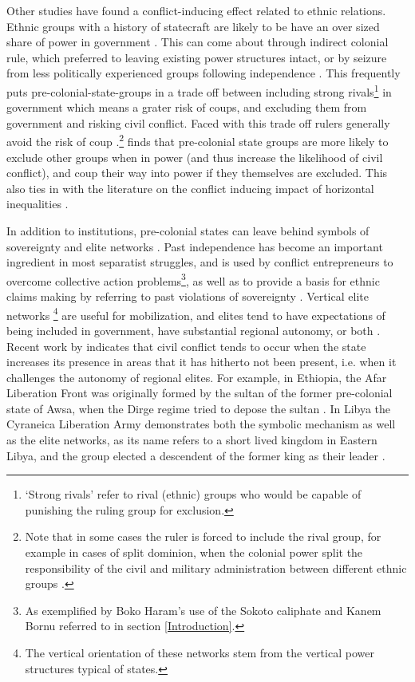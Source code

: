 \documentclass[12pt]{article}
\begin{document}
Other studies have found a conflict-inducing effect related to ethnic relations.
Ethnic groups with a history of statecraft are likely to be have an over sized
share of power in government \citep{Wucherpfennig2016}. This can come about
through indirect colonial rule, which preferred to leaving existing power
structures intact, or by seizure from less politically experienced groups
following independence \citep{Paine2019}. This frequently puts
pre-colonial-state-groups in a trade off between including strong
rivals\footnote{`Strong rivals' refer to rival (ethnic) groups who would be
capable of punishing the ruling group for exclusion.} in government which means
a grater risk of coups, and excluding them from government and risking civil
conflict. Faced with this trade off rulers generally avoid the risk of coup
\citep{Paine2019, Powell_2014, Roessler_2011}.\footnote{Note that in some cases
	the ruler is forced to include the rival group, for example in cases of
split dominion, when the colonial power split the responsibility of the civil
and military administration between different ethnic groups \citep{Paine2019}.}
\citet{Paine2019} finds that pre-colonial state groups are more likely to
exclude other groups when in power (and thus increase the likelihood of civil
conflict), and coup their way into power if they themselves are excluded. This
also ties in with the literature on the conflict inducing impact of horizontal
inequalities \citep{CEDERMAN_2011}.

In addition to institutions, pre-colonial states can leave behind symbols of
sovereignty and elite networks \citep{Wishman}. Past independence has become an
important ingredient in most separatist struggles, and is used by conflict
entrepreneurs to overcome collective action problems\footnote{As exemplified by
Boko Haram's use of the Sokoto caliphate and Kanem Bornu referred to in section
\ref{Introduction}.}, as well as to provide a basis for ethnic claims making by
referring to past violations of sovereignty \citep{Ahram2019, Shelef2016}.
Vertical elite networks \footnote{The vertical orientation of these networks
stem from the vertical power structures typical of states.} are useful for
mobilization, and elites tend to have expectations of being included in
government, have substantial regional autonomy, or both \citep{Wishman}. Recent
work by \citet{Ying_2020} indicates that civil conflict tends to occur when the
state increases its presence in areas that it has hitherto not been present,
i.e. when it challenges the autonomy of regional elites. For example, in
Ethiopia, the Afar Liberation Front was originally formed by the sultan of the
former pre-colonial state of Awsa, when the Dirge regime tried to depose the
sultan \citep{Shehim1985, Hanfare2011}.  In Libya the Cyraneica Liberation Army
demonstrates both the symbolic mechanism as well as the elite networks, as its
name refers to a short lived kingdom in Eastern Libya, and the group elected a
descendent of the former king as their leader \citep{Ahram2019}. 
\end{document}

